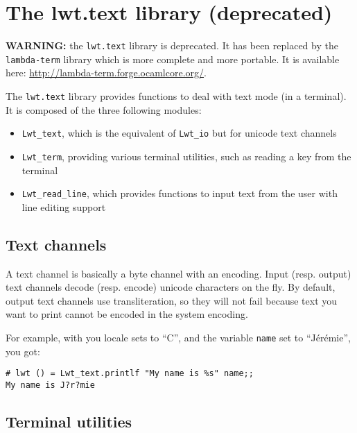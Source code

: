 \noindent
\section{ The lwt.text library (deprecated) }

  {\bfseries WARNING:} the {\tt lwt.text} library is deprecated. It has been
replaced by the {\tt lambda-term} library which is more complete and
more portable. It is available here:
\hyperref[http://lambda-term.forge.ocamlcore.org/]{http://lambda-term.forge.ocamlcore.org/}.



The {\tt lwt.text} library provides functions to deal with text
mode (in a terminal). It is composed of the three following modules:



\begin{itemize}
\item  {\tt Lwt\_text}, which is the equivalent of {\tt Lwt\_io}
but for unicode text channels
\item  {\tt Lwt\_term}, providing various terminal utilities, such as
reading a key from the terminal
\item  {\tt Lwt\_read\_line}, which provides functions to input text
from the user with line editing support

\end{itemize}

\subsection{ Text channels }

A text channel is basically a byte channel with an encoding. Input
(resp. output) text channels decode (resp. encode) unicode characters
on the fly. By default, output text channels use transliteration, so
they will not fail because text you want to print cannot be encoded
in the system encoding.



For example, with you locale sets to ``C'', and the variable
{\tt name} set to ``Jérémie'', you got:



\lstset{language=[Objective]Caml}\begin{lstlisting}
# lwt () = Lwt_text.printlf "My name is %s" name;;
My name is J?r?mie
\end{lstlisting}
\medskip

\noindent
\subsection{ Terminal utilities }

